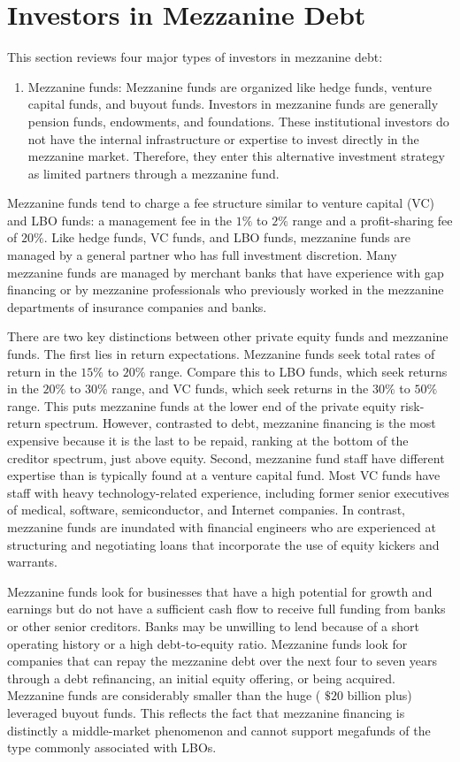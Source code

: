 \documentclass[11pt]{article}
\begin{document}
\section*{Investors in Mezzanine Debt}
This section reviews four major types of investors in mezzanine debt:

\begin{enumerate}
  \item Mezzanine funds: Mezzanine funds are organized like hedge funds, venture capital funds, and buyout funds. Investors in mezzanine funds are generally pension funds, endowments, and foundations. These institutional investors do not have the internal infrastructure or expertise to invest directly in the mezzanine market. Therefore, they enter this alternative investment strategy as limited partners through a mezzanine fund.
\end{enumerate}

Mezzanine funds tend to charge a fee structure similar to venture capital (VC) and LBO funds: a management fee in the $1 \%$ to $2 \%$ range and a profit-sharing fee of $20 \%$. Like hedge funds, VC funds, and LBO funds, mezzanine funds are managed by a general partner who has full investment discretion. Many mezzanine funds are managed by merchant banks that have experience with gap financing or by mezzanine professionals who previously worked in the mezzanine departments of insurance companies and banks.

There are two key distinctions between other private equity funds and mezzanine funds. The first lies in return expectations. Mezzanine funds seek total rates of return in the $15 \%$ to $20 \%$ range. Compare this to LBO funds, which seek returns in the $20 \%$ to $30 \%$ range, and VC funds, which seek returns in the $30 \%$ to $50 \%$ range. This puts mezzanine funds at the lower end of the private equity risk-return spectrum. However, contrasted to debt, mezzanine financing is the most expensive because it is the last to be repaid, ranking at the bottom of the creditor spectrum, just above equity. Second, mezzanine fund staff have different expertise than is typically found at a venture capital fund. Most VC funds have staff with heavy technology-related experience, including former senior executives of medical, software, semiconductor, and Internet companies. In contrast, mezzanine funds are inundated with financial engineers who are experienced at structuring and negotiating loans that incorporate the use of equity kickers and warrants.

Mezzanine funds look for businesses that have a high potential for growth and earnings but do not have a sufficient cash flow to receive full funding from banks or other senior creditors. Banks may be unwilling to lend because of a short operating history or a high debt-to-equity ratio. Mezzanine funds look for companies that can repay the mezzanine debt over the next four to seven years through a debt refinancing, an initial equity offering, or being acquired. Mezzanine funds are considerably smaller than the huge ( $\$ 20$ billion plus) leveraged buyout funds. This reflects the fact that mezzanine financing is distinctly a middle-market phenomenon and cannot support megafunds of the type commonly associated with LBOs.
\end{document}
